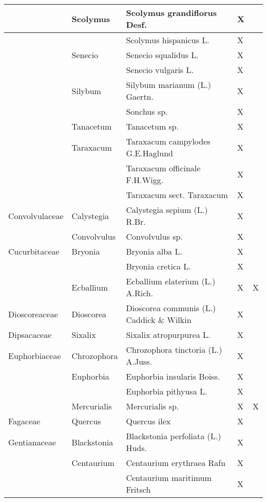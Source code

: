 \documentclass[main.tex]{subfiles}
\begin{document}
\begin{table}[!ht]
\begin{tabular}[\footnotesize]{|p{2.4cm}|p{1.9cm}|p{5.8cm}|p{1.1cm}|p{1cm}|}
        ~ & Scolymus & Scolymus grandiflorus Desf. & X & ~ \\ \hline
        ~ & ~ & Scolymus hispanicus L. & X & ~ \\ \hline
        ~ & Senecio & Senecio squalidus L. & X & ~ \\ \hline
        ~ & ~ & Senecio vulgaris L. & X & ~ \\ \hline
        ~ & Silybum & Silybum marianum (L.) Gaertn. & X & ~ \\ \hline
        ~ & ~ & Sonchus sp. & X & ~ \\ \hline
        ~ & Tanacetum & Tanacetum sp. & X & ~ \\ \hline
        ~ & Taraxacum & Taraxacum campylodes G.E.Haglund & X & ~ \\ \hline
        ~ & ~ & Taraxacum officinale F.H.Wigg. & X & ~ \\ \hline
        ~ & ~ & Taraxacum sect. Taraxacum  & X & ~ \\ \hline
        Convolvulaceae & Calystegia & Calystegia sepium (L.) R.Br. & X & ~ \\ \hline
        ~ & Convolvulus & Convolvulus sp. & X & ~ \\ \hline
        Cucurbitaceae & Bryonia & Bryonia alba L. & X & ~ \\ \hline
        ~ & ~ & Bryonia cretica L. & X & ~ \\ \hline
        ~ & Ecballium & Ecballium elaterium (L.) A.Rich. & X & X \\ \hline
        Dioscoreaceae & Dioscorea & Dioscorea communis (L.) Caddick \& Wilkin & X & ~ \\ \hline
        Dipsacaceae & Sixalix & Sixalix atropurpurea L. & X & ~ \\ \hline
        Euphorbiaceae & Chrozophora & Chrozophora tinctoria (L.) A.Juss. & X & ~ \\ \hline
        ~ & Euphorbia & Euphorbia insularis Boiss. & X & ~ \\ \hline
        ~ & ~ & Euphorbia pithyusa L. & X & ~ \\ \hline
        ~ & Mercurialis & Mercurialis sp. & X & X \\ \hline
        Fagaceae & Quercus & Quercus ilex & X & ~ \\ \hline
        Gentianaceae & Blackstonia & Blackstonia perfoliata (L.) Huds. & X & ~ \\ \hline
        ~ & Centaurium & Centaurium erythraea Rafn & X & ~ \\ \hline
        ~ & ~ & Centaurium maritimum Fritsch & X & ~ \\ \hline

\end{tabular}
\end{table}
\end{document}
